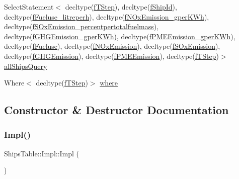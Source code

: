 \begin{DoxyCompactItemize}
Select\+Statement$<$ decltype(\mbox{\hyperlink{struct_ships_table_1_1_impl_a5349975645b3eb74fe50510c44cc7ffb}{f\+T\+Step}}), decltype(\mbox{\hyperlink{struct_ships_table_1_1_impl_a50136df8b124ebd45e97142ee1e0e19e}{f\+Ship\+Id}}), decltype(\mbox{\hyperlink{struct_ships_table_1_1_impl_a74262a4b0a8c274d4c6d2b865f166a4f}{f\+Fueluse\+\_\+litreperh}}), decltype(\mbox{\hyperlink{struct_ships_table_1_1_impl_ac0c35c7a9d264fc3269376e25c173718}{f\+N\+Ox\+Emission\+\_\+gper\+K\+Wh}}), decltype(\mbox{\hyperlink{struct_ships_table_1_1_impl_afb5a137533b442216a6ee10fb6d0c5f7}{f\+S\+Ox\+Emission\+\_\+percentpertotalfuelmass}}), decltype(\mbox{\hyperlink{struct_ships_table_1_1_impl_a1ab1d9871411b949d1c0aa2094def1ad}{f\+G\+H\+G\+Emission\+\_\+gper\+K\+Wh}}), decltype(\mbox{\hyperlink{struct_ships_table_1_1_impl_a6ca431ea16c9cc70afb8a37e844fd7d3}{f\+P\+M\+E\+Emission\+\_\+gper\+K\+Wh}}), decltype(\mbox{\hyperlink{struct_ships_table_1_1_impl_a92d2ff078567c54fd9caaea72b3a2b66}{f\+Fueluse}}), decltype(\mbox{\hyperlink{struct_ships_table_1_1_impl_a0cf4f3a3fef002e3fcf44cad3652ed39}{f\+N\+Ox\+Emission}}), decltype(\mbox{\hyperlink{struct_ships_table_1_1_impl_a81b4ad6a2480a51ac1fe59072ea48f08}{f\+S\+Ox\+Emission}}), decltype(\mbox{\hyperlink{struct_ships_table_1_1_impl_ab0f4e9ae1ef2729926f1f9f2130e31f3}{f\+G\+H\+G\+Emission}}), decltype(\mbox{\hyperlink{struct_ships_table_1_1_impl_a6e5837ad78a1a253dd1289ff1d73ce80}{f\+P\+M\+E\+Emission}}), decltype(\mbox{\hyperlink{struct_ships_table_1_1_impl_a5349975645b3eb74fe50510c44cc7ffb}{f\+T\+Step}})$>$ \mbox{\hyperlink{struct_ships_table_1_1_impl_aace246a119b4bca3f0954a1561d6fbc8}{all\+Ships\+Query}}
\item 
Where$<$ decltype(\mbox{\hyperlink{struct_ships_table_1_1_impl_a5349975645b3eb74fe50510c44cc7ffb}{f\+T\+Step}})$>$ \mbox{\hyperlink{struct_ships_table_1_1_impl_a8ab829285cf4d7a01fb877dc5e8c220e}{where}}
\end{DoxyCompactItemize}


\subsection{Constructor \& Destructor Documentation}
\mbox{\label{struct_ships_table_1_1_impl_a56d409142cfcce7344864846eee9a4e4}} 
\subsubsection{\texorpdfstring{Impl()}{Impl()}}
{\footnotesize\ttfamily Ships\+Table\+::\+Impl\+::\+Impl (\begin{DoxyParamCaption}{ }\end{DoxyParamCaption})\hspace{0.3cm}{\ttfamily [inline]}}



